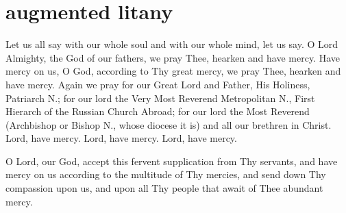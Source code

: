 \section{augmented litany}

\begin{liturgicaltext}
    \deacon Let us all say with our whole soul and with our whole mind, let us say.
    \choir {}
    \deacon O Lord Almighty, the God of our fathers, we pray Thee, hearken and have mercy.
    \choir {}
    \deacon Have mercy on us, O God, according to Thy great mercy, we pray Thee, hearken and have mercy.
    \choir {}
    \deacon Again we pray for our Great Lord and Father, His Holiness, Patriarch N.; for our lord the Very Most Reverend Metropolitan N., First Hierarch of the Russian Church Abroad; for our lord the Most Reverend (Archbishop or Bishop N., whose diocese it is) and all our brethren in Christ.
    \choirsemisecret Lord, have mercy. Lord, have mercy. Lord, have mercy. 
\end{liturgicaltext}
\begin{semisecret}
    \begin{secretprayer}
        O Lord, our God, accept this fervent supplication from Thy servants, and have mercy on us according to the multitude of Thy mercies, and send down Thy compassion upon us, and upon all Thy people that await of Thee abundant mercy.
    \end{secretprayer}
\end{semisecret}
